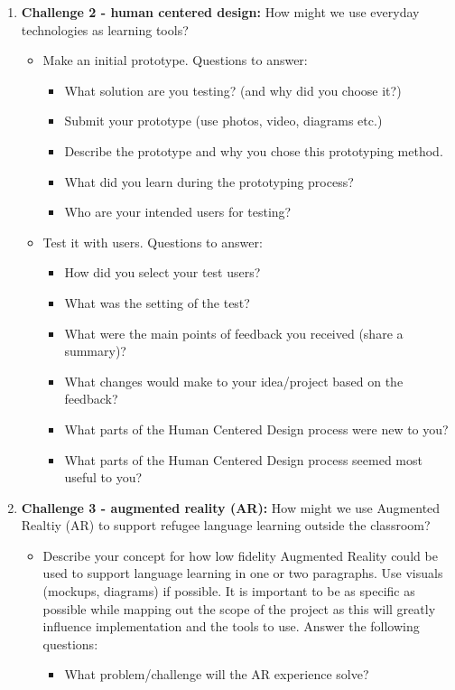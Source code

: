 \documentclass[12pt,twoside,vi]{mitthesis}
\begin{document}
\begin{enumerate}
\begin{itemize}
\end{itemize}
\item \textbf{Challenge 2 - human centered design:} How might we use everyday technologies as learning tools?
\begin{itemize}
\item Make an initial prototype. Questions to answer:
\begin{itemize}
\item What solution are you testing? (and why did you choose it?)
\item Submit your prototype (use photos, video, diagrams etc.)
\item Describe the prototype and why you chose this prototyping method. 
\item What did you learn during the prototyping process?
\item Who are your intended users for testing?
\end{itemize}
\item Test it with users. Questions to answer:
\begin{itemize}
\item How did you select your test users? 
\item What was the setting of the test? 
\item What were the main points of feedback you received (share a summary)? 
\item What changes would make to your idea/project based on the feedback?
\item What parts of the Human Centered Design process were new to you?
\item What parts of the Human Centered Design process seemed most useful to you?
\end{itemize}
\end{itemize}
\item \textbf{Challenge 3 - augmented reality (AR):} How might we use Augmented Realtiy (AR) to support refugee language learning outside the classroom?
\begin{itemize}
\item Describe your concept for how low fidelity Augmented Reality could be used to support language learning in one or two paragraphs. Use visuals (mockups, diagrams) if possible. It is important to be as specific as possible while mapping out the scope of the project as this will greatly influence implementation and the tools to use. Answer the following questions:
\begin{itemize}
\item What problem/challenge will the AR experience solve? 

\end{itemize}
\end{itemize}
\end{enumerate}
\end{document}
